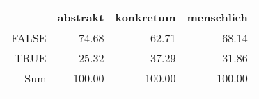 \begin{tabular}{rrrr}
  \lsptoprule
 & abstrakt & konkretum & menschlich \\ 
  \midrule
FALSE & 74.68 & 62.71 & 68.14 \\ 
  TRUE & 25.32 & 37.29 & 31.86 \\ 
  Sum & 100.00 & 100.00 & 100.00 \\ 
   \lspbottomrule
\end{tabular}
